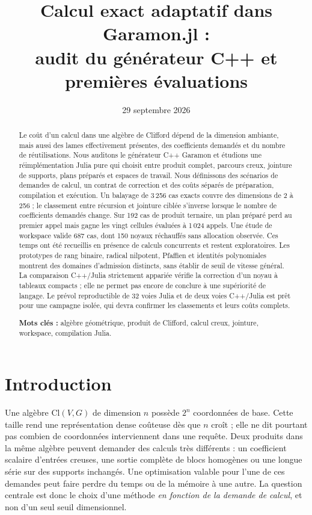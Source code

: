 \documentclass[11pt,a4paper]{article}
\title{Calcul exact adaptatif dans Garamon.jl :\\
audit du générateur C++ et premières évaluations}
\author{}
\date{29 septembre 2026}
\newcommand{\Cl}{\mathrm{Cl}}
\begin{document}
\maketitle
\begin{abstract}
Le coût d'un calcul dans une algèbre de Clifford dépend de la dimension
ambiante, mais aussi des lames effectivement présentes, des coefficients
demandés et du nombre de réutilisations. Nous auditons le générateur C++
Garamon et étudions une réimplémentation Julia pure qui choisit entre
produit complet, parcours creux, jointure de supports, plans préparés et
espaces de travail. Nous définissons des scénarios de demandes de calcul,
un contrat de correction et des coûts séparés de préparation, compilation
et exécution. Un balayage de 3\,256 cas exacts couvre des dimensions de 2
à 256 ; le classement entre récursion et jointure ciblée s'inverse lorsque
le nombre de coefficients demandés change. Sur 192 cas de produit ternaire,
un plan préparé perd au premier appel mais gagne les vingt cellules
évaluées à 1\,024 appels. Une étude de workspace valide 687 cas, dont
150 noyaux réchauffés sans allocation observée. Ces temps ont été
recueillis en présence de calculs concurrents et restent exploratoires.
Les prototypes de rang binaire, radical nilpotent, Pfaffien et identités
polynomiales montrent des domaines d'admission distincts, sans établir
de seuil de vitesse général. La comparaison C++/Julia strictement
appariée vérifie la correction d'un noyau à tableaux compacts ; elle ne permet pas
encore de conclure à une supériorité de langage. Le prévol reproductible
de 32 voies Julia et de deux voies C++/Julia est prêt pour une campagne
isolée, qui devra confirmer les classements et leurs coûts complets.
\par\smallskip\noindent\textbf{Mots clés :} algèbre géométrique,
produit de Clifford, calcul creux, jointure, workspace, compilation Julia.
\end{abstract}

\section{Introduction}
Une algèbre $\Cl(V,G)$ de dimension $n$ possède $2^n$ coordonnées de base.
Cette taille rend une représentation dense coûteuse dès que $n$ croît ; elle
ne dit pourtant pas combien de coordonnées interviennent dans une requête.
Deux produits dans la même algèbre peuvent demander des calculs très
différents : un coefficient scalaire d'entrées creuses, une sortie complète
de blocs homogènes ou une longue série sur des supports inchangés. Une
optimisation valable pour l'une de ces demandes peut faire perdre du temps
ou de la mémoire à une autre. La question centrale est donc le choix
d'une méthode \emph{en fonction de la demande de calcul}, et non d'un seul
seuil dimensionnel.
\end{document}
